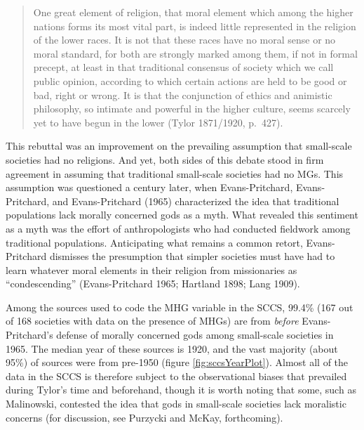 \documentclass[
]{article}
\begin{document}
\begin{quote}
One great element of religion, that moral element which among the higher nations forms its most vital part, is indeed little represented in the religion of the lower races. It is not that these races have no moral sense or no moral standard, for both are strongly marked among them, if not in formal precept, at least in that traditional consensus of society which we call public opinion, according to which certain actions are held to be good or bad, right or wrong. It is that the conjunction of ethics and animistic philosophy, so intimate and powerful in the higher culture, seems scarcely yet to have begun in the lower (Tylor 1871/1920, p.~427).
\end{quote}

This rebuttal was an improvement on the prevailing assumption that small-scale societies had no religions. And yet, both sides of this debate stood in firm agreement in assuming that traditional small-scale societies had no MGs. This assumption was questioned a century later, when Evans-Pritchard, Evans-Pritchard, and Evans-Pritchard (1965) characterized the idea that traditional populations lack morally concerned gods as a myth. What revealed this sentiment as a myth was the effort of anthropologists who had conducted fieldwork among traditional populations. Anticipating what remains a common retort, Evans-Pritchard dismisses the presumption that simpler societies must have had to learn whatever moral elements in their religion from missionaries as ``condescending'' (Evans-Pritchard 1965; Hartland 1898; Lang 1909).

Among the sources used to code the MHG variable in the SCCS, 99.4\% (167 out of 168 societies with data on the presence of MHGs) are from \emph{before} Evans-Pritchard's defense of morally concerned gods among small-scale societies in 1965. The median year of these sources is 1920, and the vast majority (about 95\%) of sources were from pre-1950 (figure \ref{fig:sccsYearPlot}). Almost all of the data in the SCCS is therefore subject to the observational biases that prevailed during Tylor's time and beforehand, though it is worth noting that some, such as Malinowski, contested the idea that gods in small-scale societies lack moralistic concerns (for discussion, see Purzycki and McKay, forthcoming).
\end{document}
